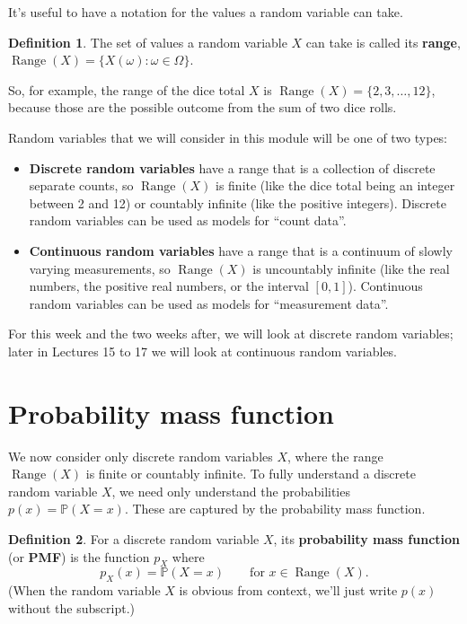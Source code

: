 \documentclass[
  a4paper,
]{book}
\providecommand{\tightlist}{%
  \setlength{\itemsep}{0pt}\setlength{\parskip}{0pt}}
\theoremstyle{definition}
\newtheorem{definition}{Definition}[chapter]
\theoremstyle{definition}
\theoremstyle{definition}
\theoremstyle{definition}
\theoremstyle{remark}
\begin{document}
It's useful to have a notation for the values a random variable can take.

\newcommand{\Range}{\operatorname{Range}}

\begin{definition}
The set of values a random variable \(X\) can take is called its \textbf{range}, \(\operatorname{Range}(X) = \{X(\omega) : \omega \in \Omega \}\).
\end{definition}

So, for example, the range of the dice total \(X\) is \(\operatorname{Range}(X) = \{2, 3, \dots, 12\}\), because those are the possible outcome from the sum of two dice rolls.

Random variables that we will consider in this module will be one of two types:

\begin{itemize}
\tightlist
\item
  \textbf{Discrete random variables} have a range that is a collection of discrete separate counts, so \(\operatorname{Range}(X)\) is finite (like the dice total being an integer between 2 and 12) or countably infinite (like the positive integers). Discrete random variables can be used as models for ``count data''.
\item
  \textbf{Continuous random variables} have a range that is a continuum of slowly varying measurements, so \(\operatorname{Range}(X)\) is uncountably infinite (like the real numbers, the positive real numbers, or the interval \([0,1]\)). Continuous random variables can be used as models for ``measurement data''.
\end{itemize}

For this week and the two weeks after, we will look at discrete random variables; later in Lectures 15 to 17 we will look at continuous random variables.

\hypertarget{pmf}{%
\section{Probability mass function}\label{pmf}}

We now consider only discrete random variables \(X\), where the range \(\operatorname{Range}(X)\) is finite or countably infinite. To fully understand a discrete random variable \(X\), we need only understand the probabilities \(p(x) = \mathbb P(X = x)\). These are captured by the probability mass function.

\begin{definition}
For a discrete random variable \(X\), its \textbf{probability mass function} (or \textbf{PMF}) is the function \(p_X\) where
\[ p_X(x) = \mathbb P(X = x)  \qquad \text{for $x \in \operatorname{Range}(X)$.} \]
(When the random variable \(X\) is obvious from context, we'll just write \(p(x)\) without the subscript.)
\end{definition}
\end{document}
